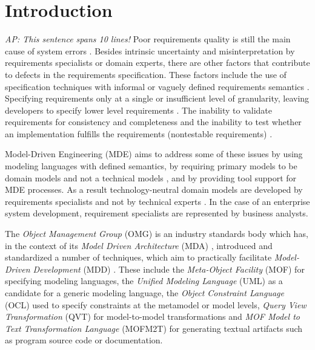 \section{Introduction}

\emph{AP: This sentence spans 10 lines!}
Poor requirements quality is still the main cause of system errors \cite{heck_experiences_2008,_strategies_2011}. Besides intrinsic uncertainty and misinterpretation by requirements specialists or domain experts, there are other factors that contribute to defects in the requirements specification. These factors include the use of specification techniques with informal or vaguely defined requirements semantics \cite{ferguson_empirical_2006}. Specifying requirements only at a single or insufficient level of granularity, leaving developers to specify lower level requirements \cite{espana_evaluating_2009, getBetterReference}. The inability to validate requirements for consistency and completeness \cite{somebodyPleaseFindASuitableReference} and the inability to test whether an implementation fulfills the requirements (nontestable requirements) \cite{bashardoust-tajali_extracting_2008}.

Model-Driven Engineering (MDE)  \cite{schmidt_model_2006} aims to address some of these issues by using modeling languages with defined semantics, by requiring primary models to be domain models and not a technical models \cite{asnina_computation_2010}, and by providing tool support for MDE processes. As a result technology-neutral domain models are developed by requirements specialists and not by technical experts \cite{asnina_computation_2010}. In the case of an enterprise system development, requirement specialists are represented by business analysts.

The {\em Object Management Group} (OMG) is an industry standards body which has, in the context of its {\em Model Driven Architecture} (MDA) \cite{siegel_developing_2001}, introduced and standardized a number of techniques, which aim to practically facilitate {\em Model-Driven Development} (MDD) \cite{}. These include the {\em Meta-Object Facility} (MOF)  \cite{_meta_2006} for specifying modeling languages, the {\em Unified Modeling Language} (UML) \cite{_uml_2010,_uml_2010-1} as a candidate for a generic modeling language, the {\em Object Constraint Language} (OCL) \cite{_object_2010} used to specify constraints at the metamodel or model levels, {\em Query View Transformation} (QVT) \cite{_meta_2011} for model-to-model transformations and {\em MOF Model to Text Transformation Language} (MOFM2T) \cite{_mof_2008} for generating textual artifacts such as program source code or documentation. 

